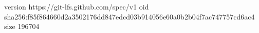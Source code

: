 version https://git-lfs.github.com/spec/v1
oid sha256:f85f864660d2a3502176dd847edcd03b914056e60a0b2b04f7ac747757cd6ac4
size 196704
